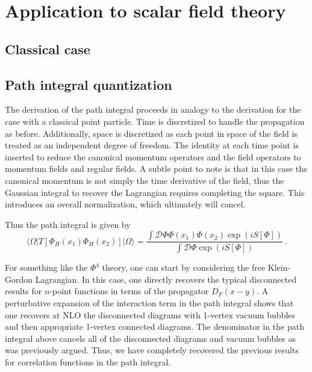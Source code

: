 \documentclass[12pt]{memoir}
\begin{document}
\section{Application to scalar field theory}

\subsection{Classical case}

\subsection{Path integral quantization}

The derivation of the path integral proceeds in analogy to the derivation for the case
with a classical point particle.
Time is discretized to handle the propagation as before.
Additionally, space is discretized as each point in space of the field is treated as an independent degree of freedom.
The identity at each time point is inserted to reduce the canonical momentum operators and the field operators
to momentum fields and regular fields.
A subtle point to note is that in this case the canonical momentum is not simply the time derivative of the field,
thus the Gaussian integral to recover the Lagrangian requires completing the square.
This introduces an overall normalization, which ultimately will cancel.

Thus the path integral is given by
\begin{equation}
  \langle \Omega \vert T[\Phi_H(x_1) \Phi_H(x_2)] \vert \Omega \rangle
  = \frac{\int \mathcal{D}\Phi \Phi(x_1) \Phi(x_2) \exp(i S[\Phi])}{\int \mathcal{D}\Phi \exp(i S[\Phi])}\,.
\end{equation}

For something like the $\Phi^4$ theory,
one can start by considering the free Klein-Gordon Lagrangian.
In this case, one directly recovers the typical disconnected results for $n$-point functions
in terms of the propagator $D_F(x-y)$.
A perturbative expansion of the interaction term in the path integral shows
that one recovers at NLO the disconnected diagrams with 1-vertex vacuum bubbles
and then appropriate 1-vertex connected diagrams.
The denominator in the path integral above cancels all of the disconnected diagrams and vacuum bubbles
as was previously argued.
Thus, we have completely recovered the previous results for correlation functions in the path integral.
\end{document}
